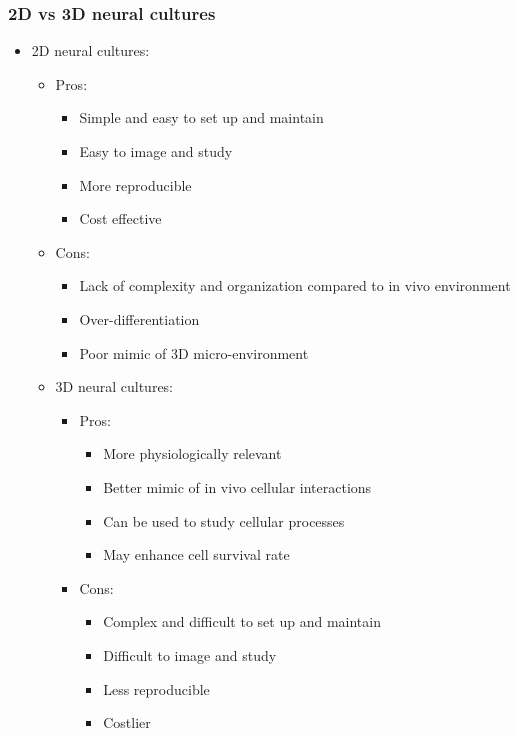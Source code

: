 \begin{itemize}
\subsubsection{2D vs 3D neural cultures}
\begin{itemize}
    \item 2D neural cultures:
    \begin{itemize}
        \item Pros: 
            \begin{itemize}
                \item Simple and easy to set up and maintain
                \item Easy to image and study
                \item More reproducible
                \item Cost effective
            \end{itemize}
        \item Cons:
            \begin{itemize}
                \item Lack of complexity and organization compared to in vivo environment
                \item Over-differentiation
                \item Poor mimic of 3D micro-environment
            \end{itemize}
    \item 3D neural cultures:
    \begin{itemize}
        \item Pros: 
            \begin{itemize}
                \item More physiologically relevant
                \item Better mimic of in vivo cellular interactions
                \item Can be used to study cellular processes
                \item May enhance cell survival rate
            \end{itemize}
        \item Cons:
            \begin{itemize}
                \item Complex and difficult to set up and maintain
                \item Difficult to image and study
                \item Less reproducible
                \item Costlier
            \end{itemize}
    \end{itemize}
\end{itemize}


\end{itemize}
\end{itemize}
